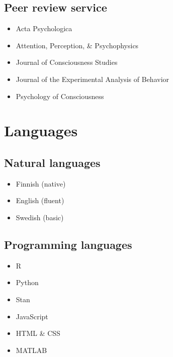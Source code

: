 \documentclass[12pt, a4paper]{article}
\begin{document}
\subsection*{Peer review service}
\begin{itemize}
\item Acta Psychologica
\item Attention, Perception, \& Psychophysics
\item Journal of Consciousness Studies
\item Journal of the Experimental Analysis of Behavior
\item Psychology of Consciousness
\end{itemize}

\section*{Languages}
\begin{multicols}{2}
\subsection*{Natural languages}
\begin{itemize}
\item Finnish (native)
\item English (fluent)
\item Swedish (basic)
\end{itemize}
\vfill\null
\columnbreak
\subsection*{Programming languages}
\begin{itemize}
\item R
\item Python
\item Stan
\item JavaScript
\item HTML \& CSS
\item MATLAB
\end{itemize}
\end{multicols}

\vfill{}
\end{document}
